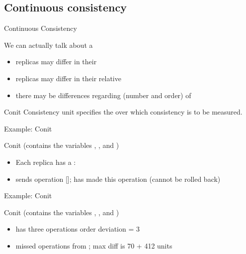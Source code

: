 \subsection{Continuous consistency}
\begin{slide}{Continuous Consistency}
  \begin{block}{We can actually talk about a }
    \begin{itemize}\tightlist
    \item replicas may differ in their 
    \item replicas may differ in their relative 
    \item there may be differences regarding (number and order) of 
    \end{itemize}
  \end{block}
  \begin{alertblock}{Conit}
    Consistency unit \mathexpr{\Rightarrow} specifies the  over which consistency is to be measured.
  \end{alertblock}
\end{slide}
\begin{slide}{Example: Conit}
  \begin{center}
  \end{center}
  \begin{block}{Conit (contains the variables , , and )}
    \begin{itemize}\tightlist
    \item Each replica has a : 
    \item {} sends  operation [];
       has made this operation  (cannot be rolled back)
    \end{itemize}
  \end{block}
\end{slide}
\begin{slide}{Example: Conit}
  \begin{center}
  \end{center}
  \begin{block}{Conit (contains the variables , , and )}
    \begin{itemize}\tightlist
    \item {} has three  operations \mathexpr{\Rightarrow} order deviation = 3
    \item {} missed  operations from ; max diff is 70 + 412 units
      \mathexpr{\Rightarrow}  
    \end{itemize}
  \end{block}
\end{slide}
